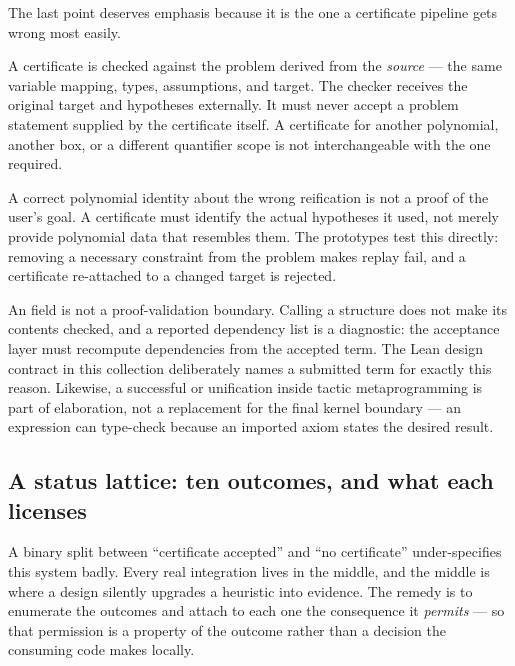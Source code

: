 The last point deserves emphasis because it is the one a certificate pipeline
gets wrong most easily.

\begin{invariant}
\label{inv:binding}
A certificate is checked against the problem derived from the \emph{source}
--- the same variable mapping, types, assumptions, and target. The checker
receives the original target and hypotheses externally. It must never accept a
problem statement supplied by the certificate itself. A certificate for
another polynomial, another box, or a different quantifier scope is not
interchangeable with the one required.
\end{invariant}

A correct polynomial identity about the wrong reification is not a proof of
the user's goal. A certificate must identify the actual hypotheses it used,
not merely provide polynomial data that resembles them. The prototypes test
this directly: removing a necessary constraint from the problem makes replay
fail, and a certificate re-attached to a changed target is rejected.

\begin{remark}
An  field is not a proof-validation boundary. Calling a structure
 does not make its contents checked, and a reported
dependency list is a diagnostic: the acceptance layer must recompute
dependencies from the accepted term. The Lean design contract in this collection
deliberately names a submitted term  for exactly this reason.
Likewise, a successful  or unification inside tactic
metaprogramming is part of elaboration, not a replacement for the final kernel
boundary --- an expression can type-check because an imported axiom states the
desired result.
\end{remark}

\subsection{A status lattice: ten outcomes, and what each licenses}
\label{sec:lattice}

A binary split between ``certificate accepted'' and ``no certificate''
under-specifies this system badly. Every real integration lives in the middle,
and the middle is where a design silently upgrades a heuristic into evidence.
The remedy is to enumerate the outcomes and attach to each one the consequence
it \emph{permits} --- so that permission is a property of the outcome rather
than a decision the consuming code makes locally.

